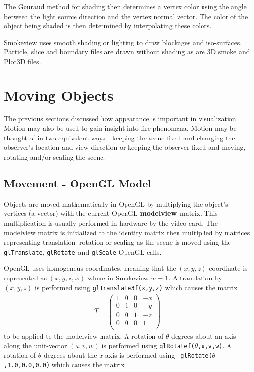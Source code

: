 \documentclass[11pt,twoside]{book}
\begin{document}
The Gouraud method for shading then determines a vertex color
using the angle between the light source direction and the vertex
normal vector. The color of the object being shaded is then
determined by interpolating these colors.

Smokeview uses smooth shading or lighting to draw blockages and
iso-surfaces. Particle, slice and boundary files are drawn without
shading as are 3D smoke and Plot3D files.



\chapter{Moving Objects} The previous sections discussed how appearance
is important in visualization.  Motion may also be used to gain insight
into fire phenomena.
Motion may be thought of in two equivalent ways - keeping the
scene fixed and changing the observer's location and view
direction or keeping the observer fixed and moving, rotating
and/or scaling the scene.

\section{Movement - OpenGL Model}
Objects are moved mathematically in OpenGL by multiplying the
object's vertices (a vector) with the current OpenGL {\bf
modelview}\ matrix.  This multiplication is usually performed in
hardware by the video card.  The modelview matrix is initialized
to the identity matrix then multiplied by matrices representing
translation, rotation or scaling as the scene is moved using
the {\tt glTranslate}, {\tt glRotate}\ and {\tt glScale} OpenGL
calls.

OpenGL uses homogenous coordinates, meaning that
the $(x,y,z)$ coordinate is represented as $(x,y,z,w)$ where in
Smokeview $w=1$.  A translation by $(x,y,z)$ is performed using
{\tt glTranslate3f(x,y,z)} which causes the matrix
\begin{eqnarray*}
T=\left(%
\begin{array}{cccc}
  1 & 0 & 0 & -x \\
  0 & 1 & 0 & -y \\
  0 & 0 & 1 & -z \\
  0 & 0 & 0 & 1 \\
\end{array}%
\right)
\end{eqnarray*}
to be applied to the modelview matrix.  A rotation of $\theta$
degrees about an axis along the unit-vector $(u,v,w)$ is performed
using {\tt glRotatef($\theta$,u,v,w)}.  A rotation of $\theta$
degrees about the $x$ axis is performed using {\tt
glRotate($\theta$,1.0,0.0,0.0)} which causes the matrix
\end{document}
